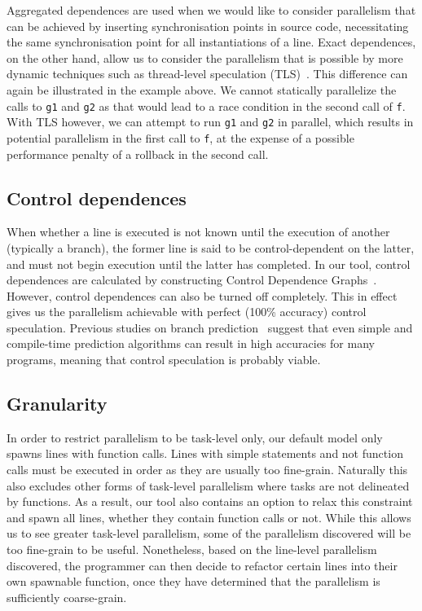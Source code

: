 Aggregated dependences are used when we would like to consider parallelism that can be achieved by inserting synchronisation points in source code, necessitating the same synchronisation point for all instantiations of a line.
Exact dependences, on the other hand, allow us to consider the parallelism that is possible by more dynamic techniques such as thread-level speculation (TLS)~\cite{Rundberg01anall-software,gregory05stampede, welc05safe}.
This difference can again be illustrated in the example above.
We cannot statically parallelize the calls to \texttt{g1} and \texttt{g2} as that would lead to a race condition in the second call of \texttt{f}.
With TLS however, we can attempt to run \texttt{g1} and \texttt{g2} in parallel, which results in potential parallelism in the first call to \texttt{f}, at the expense of a possible performance penalty of a rollback in the second call.

\subsection{Control dependences}
When whether a line is executed is not known until the execution of another (typically a branch), the former line is said to be control-dependent on the latter, and must not begin execution until the latter has completed.
In our tool, control dependences are calculated by constructing Control Dependence Graphs~\cite{ferrante87program}.
However, control dependences can also be turned off completely.
This in effect gives us the parallelism achievable with perfect (100\% accuracy) control speculation.
Previous studies on branch prediction~\cite{smith98study} suggest that even simple and compile-time prediction algorithms can result in high accuracies for many programs, meaning that control speculation is probably viable.

\subsection{Granularity}
In order to restrict parallelism to be task-level only, our default model only spawns lines with function calls.
Lines with simple statements and not function calls must be executed in order as they are usually too fine-grain.
Naturally this also excludes other forms of task-level parallelism where tasks are not delineated by functions.
As a result, our tool also contains an option to relax this constraint and spawn all lines, whether they contain function calls or not.
While this allows us to see greater task-level parallelism, some of the parallelism discovered will be too fine-grain to be useful.
Nonetheless, based on the line-level parallelism discovered, the programmer can then decide to refactor certain lines into their own spawnable function, once they have determined that the parallelism is sufficiently coarse-grain.

